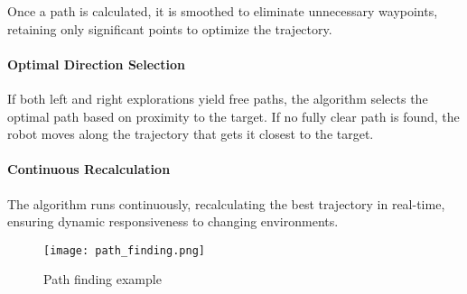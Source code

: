 Once a path is calculated, it is smoothed to eliminate unnecessary waypoints, retaining only significant points to optimize the trajectory.

\paragraph{Optimal Direction Selection}

If both left and right explorations yield free paths, the algorithm selects the optimal path based on proximity to the target. If no fully clear path is found, the robot moves along the trajectory that gets it closest to the target.

\paragraph{Continuous Recalculation}

The algorithm runs continuously, recalculating the best trajectory in real-time, ensuring dynamic responsiveness to changing environments.

\begin{figure}
    \centering
    \texttt{[image: path\_finding.png]}
    \caption{Path finding example}
    \label{fig:path_finding}
\end{figure}
